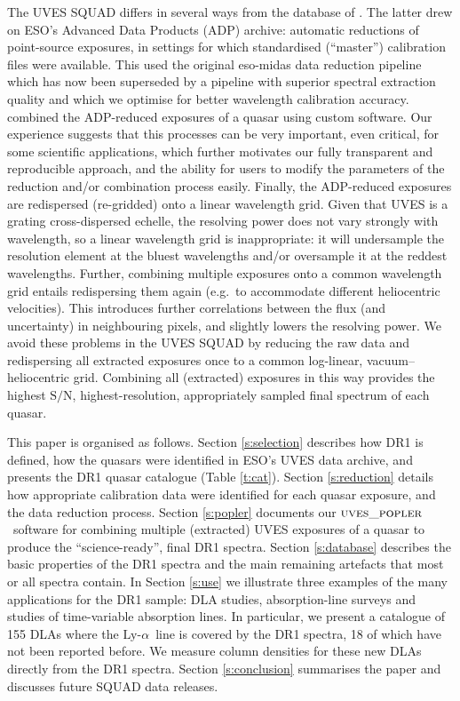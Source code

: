 \documentclass[fleqn,usenatbib,usedcolumn]{mnras}
\newcommand{\Sref}[1]{Section \ref{#1}}
\newcommand{\Tref}[1]{Table \ref{#1}}
\newcommand{\SN}{\ensuremath{\textrm{S/N}}}
\newcommand{\lya}{\ensuremath{\textrm{Ly-}\alpha}}
\newcommand{\popler}{\ensuremath{\textsc{uves\_popler}}}
\begin{document}
The UVES SQUAD differs in several ways from the database of \citet{Zafar:2013:A140}. The latter drew on ESO's Advanced Data Products (ADP) archive: automatic reductions of point-source exposures, in settings for which standardised (``master'') calibration files were available. This used the original {\sc eso-midas} data reduction pipeline which has now been superseded by a pipeline with superior spectral extraction quality and which we optimise for better wavelength calibration accuracy. \citeauthor{Zafar:2013:A140} combined the ADP-reduced exposures of a quasar using custom software. Our experience suggests that this processes can be very important, even critical, for some scientific applications, which further motivates our fully transparent and reproducible approach, and the ability for users to modify the parameters of the reduction and/or combination process easily. Finally, the ADP-reduced exposures are redispersed (re-gridded) onto a linear wavelength grid. Given that UVES is a grating cross-dispersed echelle, the resolving power does not vary strongly with wavelength, so a linear wavelength grid is inappropriate: it will undersample the resolution element at the bluest wavelengths and/or oversample it at the reddest wavelengths. Further, combining multiple exposures onto a common wavelength grid entails redispersing them again (e.g.\ to accommodate different heliocentric velocities). This introduces further correlations between the flux (and uncertainty) in neighbouring pixels, and slightly lowers the resolving power. We avoid these problems in the UVES SQUAD by reducing the raw data and redispersing all extracted exposures once to a common log-linear, vacuum--heliocentric grid. Combining all (extracted) exposures in this way provides the highest \SN, highest-resolution, appropriately sampled final spectrum of each quasar.

This paper is organised as follows. \Sref{s:selection} describes how DR1 is defined, how the quasars were identified in ESO's UVES data archive, and presents the DR1 quasar catalogue (\Tref{t:cat}). \Sref{s:reduction} details how appropriate calibration data were identified for each quasar exposure, and the data reduction process. \Sref{s:popler} documents our \popler\ software for combining multiple (extracted) UVES exposures of a quasar to produce the ``science-ready'', final DR1 spectra. \Sref{s:database} describes the basic properties of the DR1 spectra and the main remaining artefacts that most or all spectra contain. In \Sref{s:use} we illustrate three examples of the many applications for the DR1 sample: DLA studies, absorption-line surveys and studies of time-variable absorption lines. In particular, we present a catalogue of 155 DLAs where the \lya\ line is covered by the DR1 spectra, 18 of which have not been reported before. We measure  column densities for these new DLAs directly from the DR1 spectra. \Sref{s:conclusion} summarises the paper and discusses future SQUAD data releases.
\end{document}
